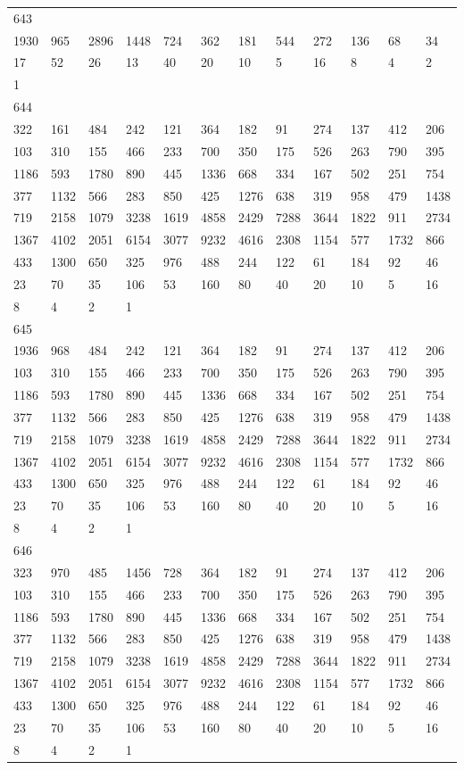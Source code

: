 \begin{longtable}{llllllllllll}
643&&&&&&&&&&&\\
1930& 965& 2896& 1448& 724& 362& 181& 544& 272& 136& 68& 34\\
17& 52& 26& 13& 40& 20& 10& 5& 16& 8& 4& 2\\
1& \\

644&&&&&&&&&&&\\
322& 161& 484& 242& 121& 364& 182& 91& 274& 137& 412& 206\\
103& 310& 155& 466& 233& 700& 350& 175& 526& 263& 790& 395\\
1186& 593& 1780& 890& 445& 1336& 668& 334& 167& 502& 251& 754\\
377& 1132& 566& 283& 850& 425& 1276& 638& 319& 958& 479& 1438\\
719& 2158& 1079& 3238& 1619& 4858& 2429& 7288& 3644& 1822& 911& 2734\\
1367& 4102& 2051& 6154& 3077& 9232& 4616& 2308& 1154& 577& 1732& 866\\
433& 1300& 650& 325& 976& 488& 244& 122& 61& 184& 92& 46\\
23& 70& 35& 106& 53& 160& 80& 40& 20& 10& 5& 16\\
8& 4& 2& 1& \\

645&&&&&&&&&&&\\
1936& 968& 484& 242& 121& 364& 182& 91& 274& 137& 412& 206\\
103& 310& 155& 466& 233& 700& 350& 175& 526& 263& 790& 395\\
1186& 593& 1780& 890& 445& 1336& 668& 334& 167& 502& 251& 754\\
377& 1132& 566& 283& 850& 425& 1276& 638& 319& 958& 479& 1438\\
719& 2158& 1079& 3238& 1619& 4858& 2429& 7288& 3644& 1822& 911& 2734\\
1367& 4102& 2051& 6154& 3077& 9232& 4616& 2308& 1154& 577& 1732& 866\\
433& 1300& 650& 325& 976& 488& 244& 122& 61& 184& 92& 46\\
23& 70& 35& 106& 53& 160& 80& 40& 20& 10& 5& 16\\
8& 4& 2& 1& \\

646&&&&&&&&&&&\\
323& 970& 485& 1456& 728& 364& 182& 91& 274& 137& 412& 206\\
103& 310& 155& 466& 233& 700& 350& 175& 526& 263& 790& 395\\
1186& 593& 1780& 890& 445& 1336& 668& 334& 167& 502& 251& 754\\
377& 1132& 566& 283& 850& 425& 1276& 638& 319& 958& 479& 1438\\
719& 2158& 1079& 3238& 1619& 4858& 2429& 7288& 3644& 1822& 911& 2734\\
1367& 4102& 2051& 6154& 3077& 9232& 4616& 2308& 1154& 577& 1732& 866\\
433& 1300& 650& 325& 976& 488& 244& 122& 61& 184& 92& 46\\
23& 70& 35& 106& 53& 160& 80& 40& 20& 10& 5& 16\\
8& 4& 2& 1& \\


\end{longtable}
